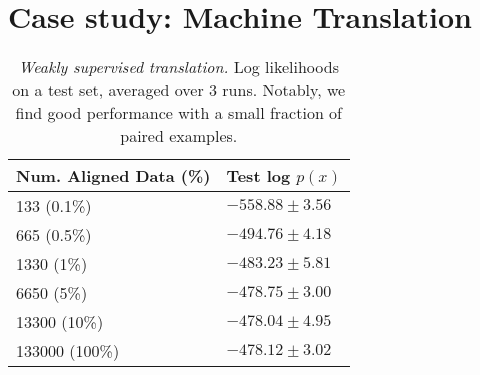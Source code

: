 \section{Case study: Machine Translation}
\begin{table}[h!]
\centering
\begin{tabular}{l|l}
    \toprule
    Num. Aligned Data (\%) & Test log $p(x)$ \\
    \hline
    133 (0.1\%) & $-558.88 \pm 3.56$ \\
    665 (0.5\%) & $-494.76 \pm 4.18$\\
    1330 (1\%) & $-483.23 \pm 5.81$\\
    6650 (5\%) & $-478.75 \pm 3.00$\\
    13300 (10\%) & $-478.04 \pm 4.95$\\
    133000 (100\%) & $-478.12 \pm 3.02$\\
    \bottomrule
\end{tabular}
\caption{\textit{Weakly supervised translation.} Log likelihoods on a test set, averaged over 3 runs. Notably, we find good performance with a small fraction of paired examples.}
\label{table:translation_weaksup}
\end{table}

